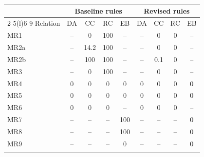 \footnotesize
\begin{tabular}{@{}lcccccccc@{}}
\toprule
 & \multicolumn{4}{c}{Baseline rules} & \multicolumn{4}{c}{Revised rules}\\
\cmidrule(lr){2-5}\cmidrule(l){6-9}
Relation & DA & CC & RC & EB & DA & CC & RC & EB\\
\midrule
MR1 & -- & 0 & 100 & -- & -- & 0 & 0 & --\\
MR2a & -- & 14.2 & 100 & -- & -- & 0 & 0 & --\\
MR2b & -- & 100 & 100 & -- & -- & 0.1 & 0 & --\\
MR3 & -- & 0 & 100 & -- & -- & 0 & 0 & --\\
MR4 & 0 & 0 & 0 & 0 & 0 & 0 & 0 & 0\\
MR5 & 0 & 0 & 0 & 0 & 0 & 0 & 0 & 0\\
MR6 & 0 & 0 & 0 & -- & 0 & 0 & 0 & --\\
MR7 & -- & -- & -- & 100 & -- & -- & -- & 0\\
MR8 & -- & -- & -- & 100 & -- & -- & -- & 0\\
MR9 & -- & -- & -- & 0 & -- & -- & -- & 0\\
\botrule
\end{tabular}
